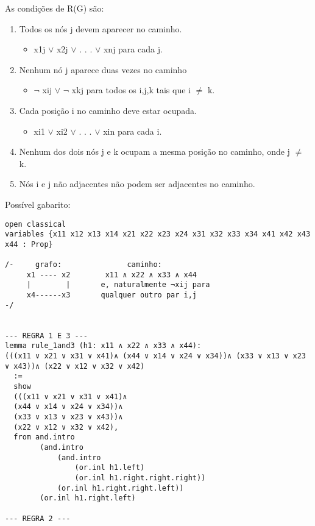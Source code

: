 \begin{enumerate}
As condições de R(G) são:
\begin{enumerate}
    \item Todos os nós j devem aparecer no caminho. 
    \begin{itemize}
    \item x1j $\lor$ x2j $\lor$ . . . $\lor$ xnj para cada j.
    \end{itemize}
    \item Nenhum nó j aparece duas vezes no caminho
    \begin{itemize}
    \item $\neg$ xij $\lor$ $\neg$ xkj para todos os i,j,k tais que i $\neq $ k.
    \end{itemize}
    \item Cada posição i no caminho deve estar ocupada.
    \begin{itemize}
    \item xi1 $\lor$ xi2 $\lor$ . . . $\lor$ xin para cada i.
    \end{itemize}
    \item Nenhum dos dois nós j e k ocupam  a mesma posição no caminho, onde j $\neq $ k.
    \item Nós i e j não adjacentes não podem ser adjacentes no caminho. 
\end{enumerate}

\bigbreak
Possível gabarito:
\begin{lstlisting}
open classical 
variables {x11 x12 x13 x14 x21 x22 x23 x24 x31 x32 x33 x34 x41 x42 x43 x44 : Prop}

/-     grafo:               caminho:
     x1 ---- x2        x11 ∧ x22 ∧ x33 ∧ x44         
     |        |       e, naturalmente ¬xij para
     x4------x3       qualquer outro par i,j          
-/


--- REGRA 1 E 3 ---
lemma rule_1and3 (h1: x11 ∧ x22 ∧ x33 ∧ x44):
(((x11 ∨ x21 ∨ x31 ∨ x41)∧ (x44 ∨ x14 ∨ x24 ∨ x34))∧ (x33 ∨ x13 ∨ x23 ∨ x43))∧ (x22 ∨ x12 ∨ x32 ∨ x42)
  :=
  show 
  (((x11 ∨ x21 ∨ x31 ∨ x41)∧ 
  (x44 ∨ x14 ∨ x24 ∨ x34))∧
  (x33 ∨ x13 ∨ x23 ∨ x43))∧
  (x22 ∨ x12 ∨ x32 ∨ x42), 
  from and.intro 
        (and.intro 
            (and.intro 
                (or.inl h1.left)
                (or.inl h1.right.right.right))
            (or.inl h1.right.right.left))
        (or.inl h1.right.left)

--- REGRA 2 ---


\end{lstlisting}
\end{enumerate}
